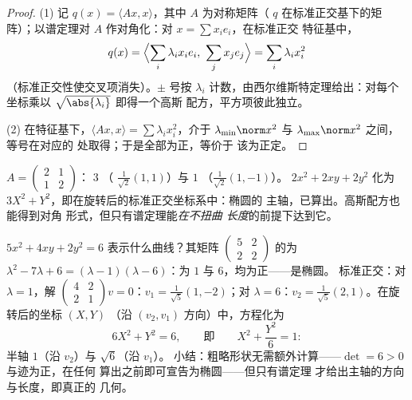 \begin{proof}
(1) 记 $q(x) = \langle A x, x\rangle$，其中 $A$ 为对称矩阵（
$q$ 在标准正交基下的矩阵）；以谱定理对 $A$
作对角化：对 $x = \sum x_ie_i$，在标准正交
特征基中，
\[
q(x) = \Bigl\langle \sum_i \lambda_ix_ie_i,\ \sum_j
x_je_j\Bigr\rangle = \sum_i \lambda_i x_i^2
\]
（标准正交性使交叉项消失）。$\pm$ 号按
$\lambda_i$ 计数，由西尔维斯特定理给出：对每个
坐标乘以 $\sqrt{\abs{\lambda_i}}$ 即得一个高斯
配方，平方项彼此独立。

(2) 在特征基下，$\langle Ax, x\rangle = \sum \lambda_i
x_i^2$，介于 $\lambda_{\min}\norm x^2$ 与
$\lambda_{\max}\norm x^2$ 之间，等号在对应的
处取得；于是全部为正，等价于
该为正定。
\end{proof}

\begin{example}\label{ex:b2:quadratic:spectralexample}
$A = \begin{pmatrix} 2 & 1\\ 1 & 2 \end{pmatrix}$： $3$
（ $\frac{1}{\sqrt2}(1,1)$）与 $1$
（$\frac{1}{\sqrt2}(1,-1)$）。 $2x^2 + 2xy + 2y^2$
化为 $3X^2 + Y^2$，即在旋转后的标准正交坐标系中：椭圆的
主轴，已算出。高斯配方也能得到对角
形式，但只有谱定理能\emph{在不扭曲
长度}的前提下达到它。
\end{example}

\begin{example}[完整识别一个椭圆]\label{ex:b2:quadratic:ellipserun}
$5x^2 + 4xy + 2y^2 = 6$ 表示什么曲线？其矩阵
$\begin{pmatrix} 5 & 2\\ 2 & 2\end{pmatrix}$ 的为 $\lambda^2 - 7\lambda + 6 = (\lambda - 1)(\lambda -
6)$：为 $1$ 与 $6$，均为正——是椭圆。
标准正交：对 $\lambda = 1$，解
$\begin{pmatrix} 4 & 2\\ 2 & 1\end{pmatrix}v = 0$：$v_1 =
\frac{1}{\sqrt5}(1, -2)$；对 $\lambda = 6$：$v_2 =
\frac{1}{\sqrt5}(2, 1)$。在旋转后的坐标 $(X, Y)$
（沿 $(v_2, v_1)$ 方向）中，方程化为
\[
6X^2 + Y^2 = 6,
\qquad\text{即}\qquad
X^2 + \frac{Y^2}{6} = 1 :
\]
半轴 $1$（沿 $v_2$）与 $\sqrt6$（沿 $v_1$）。
小结：粗略形状无需额外计算——$\det
= 6 > 0$ 与迹为正，在任何
算出之前即可宣告为椭圆——但只有谱定理
才给出主轴的方向与长度，即真正的
几何。
\end{example}

